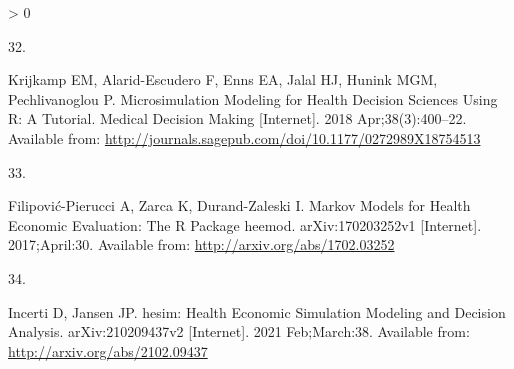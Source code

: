 \documentclass[
]{article}
\newlength{\cslhangindent}
\newlength{\csllabelwidth}
\newenvironment{CSLReferences}[2] %
 {%
  \setlength{\parindent}{0pt}
  \ifodd #1 \everypar{\setlength{\hangindent}{\cslhangindent}}\ignorespaces\fi
  \ifnum #2 > 0
  \setlength{\parskip}{#2\baselineskip}
  \fi
 }%
 {}
\newcommand{\CSLLeftMargin}[1]{\parbox[t]{\csllabelwidth}{#1}}
\newcommand{\CSLRightInline}[1]{\parbox[t]{\linewidth - \csllabelwidth}{#1}\break}
\begin{document}
\begin{CSLReferences}{0}{0}
\leavevmode\hypertarget{ref-Krijkamp2018}{}%
\CSLLeftMargin{32. }
\CSLRightInline{Krijkamp EM, Alarid-Escudero F, Enns EA, Jalal HJ, Hunink MGM, Pechlivanoglou P. {Microsimulation Modeling for Health Decision Sciences Using R: A Tutorial}. Medical Decision Making {[}Internet{]}. 2018 Apr;38(3):400--22. Available from: \url{http://journals.sagepub.com/doi/10.1177/0272989X18754513}}

\leavevmode\hypertarget{ref-Filipovic-Pierucci2017}{}%
\CSLLeftMargin{33. }
\CSLRightInline{Filipović-Pierucci A, Zarca K, Durand-Zaleski I. {Markov Models for Health Economic Evaluation: The R Package heemod}. arXiv:170203252v1 {[}Internet{]}. 2017;April:30. Available from: \url{http://arxiv.org/abs/1702.03252}}

\leavevmode\hypertarget{ref-Incerti2021}{}%
\CSLLeftMargin{34. }
\CSLRightInline{Incerti D, Jansen JP. {hesim: Health Economic Simulation Modeling and Decision Analysis}. arXiv:210209437v2 {[}Internet{]}. 2021 Feb;March:38. Available from: \url{http://arxiv.org/abs/2102.09437}}

\end{CSLReferences}
\end{document}
